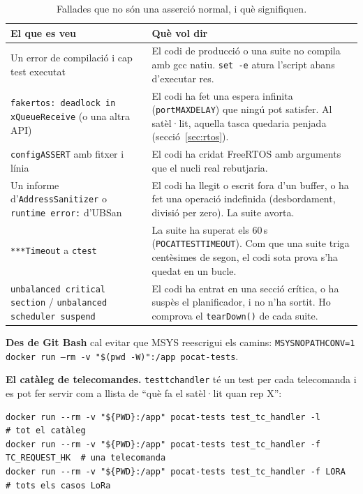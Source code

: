 \documentclass[11pt,a4paper]{article}
\DeclareRobustCommand{\_}{\textunderscore\allowbreak}
\newcommand{\cd}[1]{\texttt{#1}}
\begin{document}
\begin{table}[H]
\centering\small
\begin{tabularx}{\textwidth}{@{}>{\raggedright\arraybackslash}p{5.4cm}>{\raggedright\arraybackslash}X@{}}
\toprule
El que es veu & Què vol dir\\
\midrule
Un error de compilació i cap test executat & El codi de producció o una suite no compila amb gcc natiu. \cd{set -e} atura l'script abans d'executar res.\\
\cd{fake\_rtos: deadlock in xQueueReceive} (o una altra API) & El codi ha fet una espera infinita (\cd{portMAX\_DELAY}) que ningú pot satisfer. Al satèl·lit, aquella tasca quedaria penjada (secció~\ref{sec:rtos}).\\
\cd{configASSERT} amb fitxer i línia & El codi ha cridat FreeRTOS amb arguments que el nucli real rebutjaria.\\
Un informe d'\cd{AddressSanitizer} o \cd{runtime error:} d'UBSan & El codi ha llegit o escrit fora d'un buffer, o ha fet una operació indefinida (desbordament, divisió per zero). La suite avorta.\\
\cd{***Timeout} a \cd{ctest} & La suite ha superat els 60\,s (\cd{POCAT\_TEST\_TIMEOUT}). Com que una suite triga centèsimes de segon, el codi sota prova s'ha quedat en un bucle.\\
\cd{unbalanced critical section} / \cd{unbalanced scheduler suspend} & El codi ha entrat en una secció crítica, o ha suspès el planificador, i no n'ha sortit. Ho comprova el \cd{tearDown()} de cada suite.\\
\bottomrule
\end{tabularx}
\caption{Fallades que no són una asserció normal, i què signifiquen.}
\label{tab:testerrors}
\end{table}

\textbf{Des de Git Bash} cal evitar que MSYS reescrigui els camins:
\cd{MSYS\_NO\_PATHCONV=1 docker run --rm -v "\$(pwd -W)":/app pocat-tests}.

\textbf{El catàleg de telecomandes.} \cd{test\_tc\_handler} té un test per cada telecomanda
i es pot fer servir com a llista de ``què fa el satèl·lit quan rep X'':
\begin{lstlisting}
docker run --rm -v "${PWD}:/app" pocat-tests test_tc_handler -l                # tot el catàleg
docker run --rm -v "${PWD}:/app" pocat-tests test_tc_handler -f TC_REQUEST_HK  # una telecomanda
docker run --rm -v "${PWD}:/app" pocat-tests test_tc_handler -f LORA           # tots els casos LoRa
\end{lstlisting}
\end{document}
